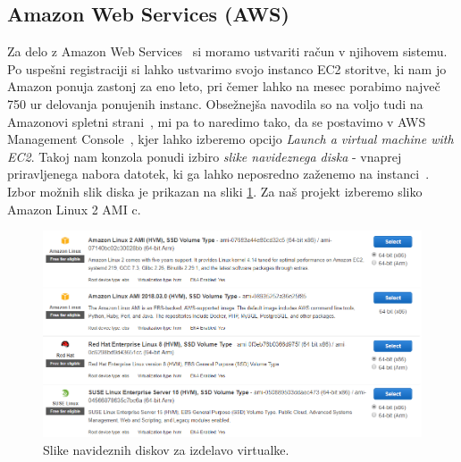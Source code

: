 \subsection{Amazon Web Services (AWS)}

Za delo z Amazon Web Services~\cite{1_aws_amazon} si moramo ustvariti račun v njihovem sistemu. Po uspešni registraciji si lahko ustvarimo svojo instanco EC2 storitve, ki nam jo Amazon ponuja zastonj za eno leto, pri čemer lahko na mesec porabimo največ 750 ur delovanja ponujenih instanc. Obsežnejša navodila so na voljo tudi na Amazonovi spletni strani~\cite{1_aws_amazon_tutorial}, mi pa to naredimo tako, da se postavimo v AWS Management Console~\cite{1_aws_amazon_console}, kjer lahko izberemo opcijo \emph{Launch a virtual machine with EC2}. Takoj nam konzola ponudi izbiro \emph{slike navideznega diska} - vnaprej priravljenega nabora datotek, ki ga lahko neposredno zaženemo na instanci~\cite{1_aws_amazon_ami}. Izbor možnih slik diska je prikazan na sliki \ref{fig:1_AWS_images}. Za naš projekt izberemo sliko Amazon Linux 2 AMI c.

\begin{figure}[H]
    \centering
    \includegraphics[scale=0.32]{Img/1_AWS_images.png}
    \caption{Slike navideznih diskov za izdelavo virtualke.}
    \label{fig:1_AWS_images}
\end{figure}

